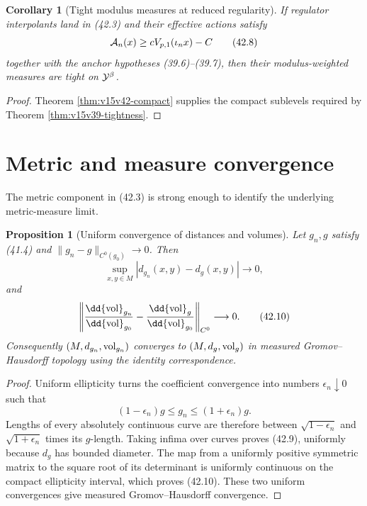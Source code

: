 \documentclass[11pt]{article}
\newtheorem{proposition}[theorem]{Proposition}
\newtheorem{corollary}[theorem]{Corollary}
\theoremstyle{remark}
\begin{document}
\begin{corollary}[Tight modulus measures at reduced regularity]
\label{cor:v15v42-tight}
If regulator interpolants land in (42.3) and their effective actions
satisfy
\[
 {\cal A}_n(x)\geq cV_{p,1}(\iota_nx)-C                 \tag{42.8}
\]
together with the anchor hypotheses (39.6)--(39.7), then their
modulus-weighted measures are tight on \({\cal Y}^{\beta}\).
\end{corollary}

\begin{proof}
Theorem \ref{thm:v15v42-compact} supplies the compact sublevels
required by Theorem \ref{thm:v15v39-tightness}.
\end{proof}

\section{Metric and measure convergence}

The metric component in (42.3) is strong enough to identify the
underlying metric-measure limit.

\begin{proposition}[Uniform convergence of distances and volumes]
\label{prop:v15v42-distance}
Let \(g_n,g\) satisfy (41.4) and
\(\|g_n-g\|_{C^0(g_0)}\to0\).  Then
\[
 \sup_{x,y\in M}|d_{g_n}(x,y)-d_g(x,y)|\longrightarrow0, \tag{42.9}
\]
and
\[
 \left\|\frac{\dd{\rm vol}_{g_n}}{\dd{\rm vol}_{g_0}}
 -\frac{\dd{\rm vol}_{g}}{\dd{\rm vol}_{g_0}}\right\|_{C^0}
 \longrightarrow0.                                     \tag{42.10}
\]
Consequently \((M,d_{g_n},{\rm vol}_{g_n})\) converges to
\((M,d_g,{\rm vol}_g)\) in measured Gromov--Hausdorff topology
using the identity correspondence.
\end{proposition}

\begin{proof}
Uniform ellipticity turns the coefficient convergence into numbers
\(\epsilon_n\downarrow0\) such that
\[
 (1-\epsilon_n)g\leq g_n\leq(1+\epsilon_n)g.             \tag{42.11}
\]
Lengths of every absolutely continuous curve are therefore between
\(\sqrt{1-\epsilon_n}\) and
\(\sqrt{1+\epsilon_n}\) times its \(g\)-length.  Taking infima over
curves proves (42.9), uniformly because \(d_g\) has bounded
diameter.  The map from a uniformly positive symmetric matrix to
the square root of its determinant is uniformly continuous on the
compact ellipticity interval, which proves (42.10).  These two
uniform convergences give measured Gromov--Hausdorff convergence.
\end{proof}
\end{document}
